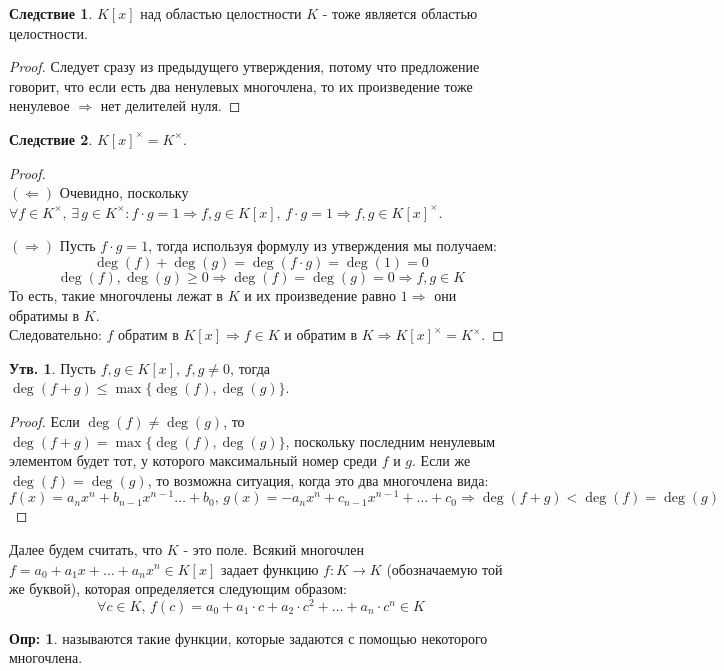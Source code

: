 \documentclass[12pt]{article}
\theoremstyle{definition}
\newtheorem{defn}{Опр:}
\newtheorem{prop}{Утв.}
\newtheorem{corollary}{Следствие}
\begin{document}
\begin{corollary}
	$K[x]$ над областью целостности $K$ - тоже является областью целостности.
\end{corollary}
\begin{proof}
	Следует сразу из предыдущего утверждения, потому что предложение говорит, что если есть два ненулевых многочлена, то их произведение тоже ненулевое $\Rightarrow$ нет делителей нуля.
\end{proof}
\begin{corollary}
	$K[x]^\times = K^\times$.
\end{corollary}
\begin{proof}\hfill\\
	$(\Leftarrow)$ Очевидно, поскольку $\forall f \in K^{\times}, \, \exists \, g \in K^{\times} \colon f{\cdot}g = 1 \Rightarrow f,g \in K[x], \, f{\cdot}g = 1 \Rightarrow f,g \in K[x]^{\times}$.
	
	$(\Rightarrow)$ Пусть $f{\cdot}g = 1$, тогда используя формулу из утверждения мы получаем:
	$$
		\deg(f) + \deg(g) = \deg(f{\cdot}g) = \deg(1) = 0
	$$	
	$$
		\deg(f), \deg(g) \geq 0 \Rightarrow \deg(f) = \deg(g) = 0 \Rightarrow f,g \in K
	$$
	То есть, такие многочлены лежат в $K$ и их произведение равно $1 \Rightarrow$ они обратимы в $K$.\\ Следовательно: $f$ обратим в $K[x] \Rightarrow f \in K$ и обратим в $K \Rightarrow K[x]^\times = K^\times$. 
\end{proof}
\begin{prop}
	Пусть $f,g \in K[x], \, f,g \neq 0$, тогда $\deg(f + g) \leq \max\{\deg(f),\deg(g)\}$.
\end{prop}
\begin{proof}
	Если $\deg(f) \neq \deg(g)$, то $\deg(f + g) = \max\{\deg(f),\deg(g)\}$, поскольку последним ненулевым элементом будет тот, у которого максимальный номер среди $f$ и $g$. Если же $\deg(f) = \deg(g)$, то возможна ситуация, когда это два многочлена вида:
	$$
		f(x) = a_nx^n + b_{n-1}x^{n-1}\dotsc + b_0, \, g(x) = -a_nx^n + c_{n-1}x^{n-1} + \dotsc + c_0 \Rightarrow \deg(f + g) < \deg(f) = \deg(g)
	$$
\end{proof}

Далее будем считать, что $K$ - это поле. Всякий многочлен $f = a_0 + a_1x + \dotsc + a_n x^n \in K[x]$ задает функцию $f \colon K \to K$ (обозначаемую той же буквой), которая определяется следующим образом:
$$
	\forall c \in K, \, f(c) = a_0 + a_1{\cdot}c + a_2{\cdot}c^2 + \dotsc + a_n{\cdot}c^n \in K
$$
\begin{defn}
	 называются такие функции, которые задаются с помощью некоторого многочлена.
\end{defn}
\end{document}
